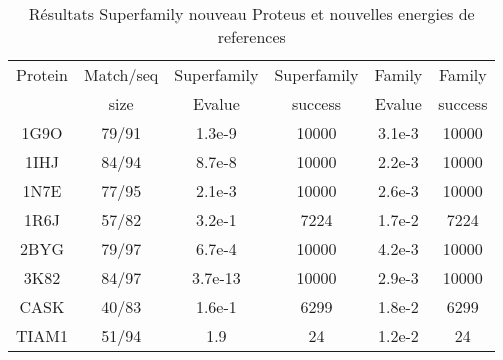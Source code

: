     \begin{table}[h]
           \raggedleft{}

      \begin{tabular}{cccccc}

        \toprule
        Protein & Match/seq & Superfamily & Superfamily & Family & Family \\
                & size      & Evalue      & success     & Evalue & success\\
        \cmidrule{1-6}
        1G9O  & 79/91 & 1.3e-9  & 10000 & 3.1e-3 &  10000  \\
        1IHJ  & 84/94 & 8.7e-8  & 10000 & 2.2e-3 &  10000  \\
        1N7E  & 77/95 & 2.1e-3  & 10000 & 2.6e-3 &  10000  \\
        1R6J  & 57/82 & 3.2e-1  & 7224  & 1.7e-2 &   7224  \\
        2BYG  & 79/97 & 6.7e-4  & 10000 & 4.2e-3 &  10000  \\
        3K82  & 84/97 & 3.7e-13 & 10000 & 2.9e-3 &  10000  \\
        CASK  & 40/83 & 1.6e-1  &  6299 & 1.8e-2 &  6299   \\
        TIAM1 & 51/94 & 1.9     &  24   & 1.2e-2 &  24     \\
        \bottomrule        
      \end{tabular}   
     \caption{Résultats Superfamily nouveau Proteus et nouvelles energies de references}   
\label{tab:superfamily_Old_MCtest}       
\end{table}







